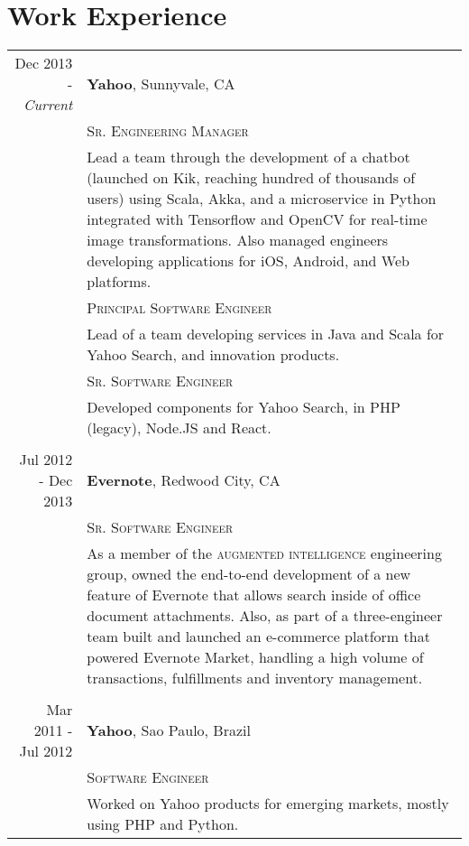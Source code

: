 \documentclass[a4paper,10pt]{article}
\begin{document}
\section{Work Experience}
\begin{tabular}{r|p{14cm}}
Dec 2013 - \emph{Current} & \textbf{Yahoo}\footnotemark,
                                Sunnyvale, CA
\\ &\textsc{Sr. Engineering Manager}\\&

 Lead a team through the development of a chatbot (launched on Kik, reaching
 hundred of thousands of users) using Scala, Akka, and a microservice in Python
 integrated with Tensorflow and OpenCV for real-time image transformations.
 Also managed engineers developing applications for iOS, Android, and Web
 platforms.

 \\
 &\textsc{Principal Software Engineer}\\&

 Lead of a team developing services in Java and Scala for Yahoo Search,
 and innovation products.

 \\
 &\textsc{Sr. Software Engineer}\\&

 Developed components for Yahoo Search, in PHP (legacy), Node.JS and React.

 \\

 \multicolumn{2}{c}{} \\

 Jul 2012 - Dec 2013 & \textbf{Evernote}, Redwood City, CA \\
 &\textsc{Sr. Software Engineer}\\&

 As a member of the \textsc{augmented intelligence} engineering group, owned
 the end-to-end development of a new feature of Evernote that allows search
 inside of office document attachments. Also, as part of a three-engineer team
 built and launched an e-commerce platform that powered Evernote Market,
 handling a high volume of transactions, fulfillments and inventory management.

 \\
 \multicolumn{2}{c}{} \\

 Mar 2011 - Jul 2012 & \textbf{Yahoo}\footnotemark[1], Sao Paulo, Brazil \\
 &\textsc{Software Engineer}\\&

 Worked on Yahoo products for emerging markets, mostly using PHP and Python.

\end{tabular}
\end{document}
